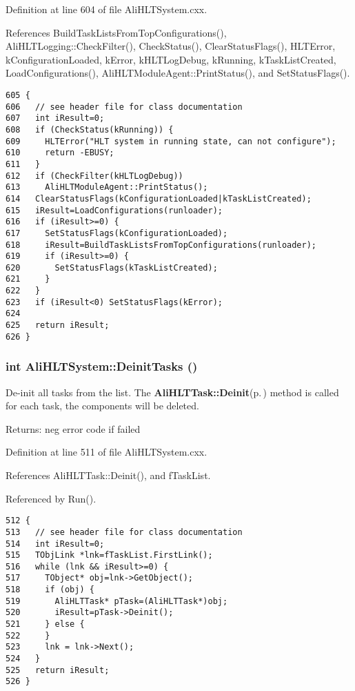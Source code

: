 Definition at line 604 of file Ali\-HLTSystem.cxx.

References Build\-Task\-Lists\-From\-Top\-Configurations(), Ali\-HLTLogging::Check\-Filter(), Check\-Status(), Clear\-Status\-Flags(), HLTError, k\-Configuration\-Loaded, k\-Error, k\-HLTLog\-Debug, k\-Running, k\-Task\-List\-Created, Load\-Configurations(), Ali\-HLTModule\-Agent::Print\-Status(), and Set\-Status\-Flags().

\footnotesize\begin{verbatim}605 {
606   // see header file for class documentation
607   int iResult=0;
608   if (CheckStatus(kRunning)) {
609     HLTError("HLT system in running state, can not configure");
610     return -EBUSY;
611   }
612   if (CheckFilter(kHLTLogDebug))
613     AliHLTModuleAgent::PrintStatus();
614   ClearStatusFlags(kConfigurationLoaded|kTaskListCreated);
615   iResult=LoadConfigurations(runloader);
616   if (iResult>=0) {
617     SetStatusFlags(kConfigurationLoaded);
618     iResult=BuildTaskListsFromTopConfigurations(runloader);
619     if (iResult>=0) {
620       SetStatusFlags(kTaskListCreated);
621     }
622   }
623   if (iResult<0) SetStatusFlags(kError);
624   
625   return iResult;
626 }
\end{verbatim}\normalsize 


\subsubsection{\setlength{\rightskip}{0pt plus 5cm}int Ali\-HLTSystem::Deinit\-Tasks ()}\label{classAliHLTSystem_a19}


De-init all tasks from the list. The {\bf Ali\-HLTTask::Deinit}{\rm (p.\,\pageref{classAliHLTTask_a6})} method is called for each task, the components will be deleted. \begin{Desc}
\item[Returns:]neg error code if failed \end{Desc}


Definition at line 511 of file Ali\-HLTSystem.cxx.

References Ali\-HLTTask::Deinit(), and f\-Task\-List.

Referenced by Run().

\footnotesize\begin{verbatim}512 {
513   // see header file for class documentation
514   int iResult=0;
515   TObjLink *lnk=fTaskList.FirstLink();
516   while (lnk && iResult>=0) {
517     TObject* obj=lnk->GetObject();
518     if (obj) {
519       AliHLTTask* pTask=(AliHLTTask*)obj;
520       iResult=pTask->Deinit();
521     } else {
522     }
523     lnk = lnk->Next();
524   }
525   return iResult;
526 }
\end{verbatim}\normalsize 


